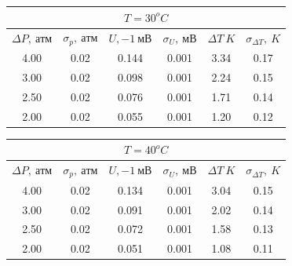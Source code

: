 \documentclass[12pt,a4paper]{article}
\begin{document}
\begin{enumerate}
    \begin{table}[htp]
        \centering
        \begin{tabular}[htp]{|c|c|c|c|c|c|}
            \hline
            \multicolumn{6}{|c|}{$T=30^oC$}\\
            \hline
            $\Delta P,\ атм$&$\sigma_p,\ атм$&$U,-1\ мВ$&$\sigma_U,\ мВ$&$\Delta T\ K$&$\sigma_{\Delta T},\ K$\\
            \hline
            4.00&0.02&0.144&0.001&3.34&0.17\\
            \hline
            3.00&0.02&0.098&0.001&2.24&0.15\\
            \hline
            2.50&0.02&0.076&0.001&1.71&0.14\\
            \hline
            2.00&0.02&0.055&0.001&1.20&0.12\\
            \hline
        \end{tabular}
    \end{table}

    \begin{table}[htp]
        \centering
        \begin{tabular}[htp]{|c|c|c|c|c|c|}
            \hline
            \multicolumn{6}{|c|}{$T=40^oC$}\\
            \hline
            $\Delta P,\ атм$&$\sigma_p,\ атм$&$U,-1\ мВ$&$\sigma_U,\ мВ$&$\Delta T\ K$&$\sigma_{\Delta T},\ K$\\
            \hline
            4.00&0.02&0.134&0.001&3.04&0.15\\
            \hline
            3.00&0.02&0.091&0.001&2.02&0.14\\
            \hline
            2.50&0.02&0.072&0.001&1.58&0.13\\
            \hline
            2.00&0.02&0.051&0.001&1.08&0.11\\
            \hline
        \end{tabular}
    \end{table}


\end{enumerate}
\end{document}
